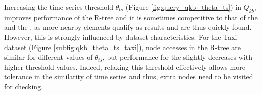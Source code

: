 Increasing the time series threshold $\theta_{ts}$ (Figure \ref{fig:query_qkb_theta_ts}) in $Q_{kb}$, improves performance of the R-tree and it is sometimes competitive to that of the \tsr and the \btsr, as more nearby elements qualify as results and are thus quickly found. However, this is strongly influenced by dataset characteristics. For the Taxi dataset (Figure \ref{subfig:qkb_theta_ts_taxi}), node accesses in the R-tree are similar for different values of $\theta_{ts}$, but performance for the \btsr slightly decreases with higher threshold values. Indeed, relaxing this threshold effectively allows more tolerance in the similarity of time series and thus, extra nodes need to be visited for checking.

\begin{figure}[!tb]
	\centering
	 \\

\end{figure}

